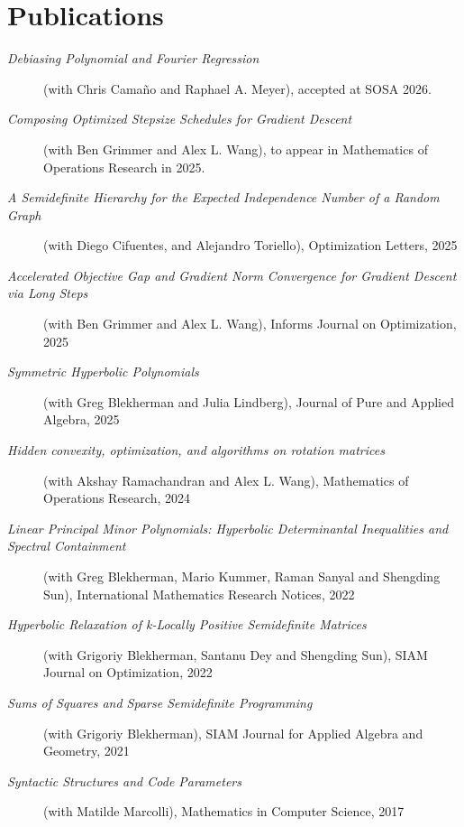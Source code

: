 \documentclass[10pt, letterpaper]{article}
\begin{document}
\section{Publications}
\begin{description}
    \item[\emph{Debiasing Polynomial and Fourier Regression}] (with Chris Camaño and Raphael A. Meyer), accepted at SOSA 2026.\\

    \item[\emph{Composing Optimized Stepsize Schedules for Gradient Descent}] (with Ben Grimmer and Alex L. Wang), to appear in Mathematics of Operations Research in 2025.\\

    \item[\emph{A Semidefinite Hierarchy for the Expected Independence Number of a Random Graph}] (with Diego Cifuentes, and Alejandro Toriello), Optimization Letters, 2025\\

    \item[\emph{Accelerated Objective Gap and Gradient Norm Convergence for Gradient Descent via Long Steps}] (with Ben Grimmer and Alex L. Wang), Informs Journal on Optimization, 2025\\

    \item[\emph{Symmetric Hyperbolic Polynomials}] (with Greg Blekherman and Julia Lindberg), Journal of Pure and Applied Algebra, 2025\\

    \item[\emph{Hidden convexity, optimization, and algorithms on rotation matrices  }] (with Akshay Ramachandran and Alex L. Wang), Mathematics of Operations Research, 2024\\

    \item[\emph{Linear Principal Minor Polynomials: Hyperbolic Determinantal Inequalities and Spectral Containment }] (with Greg Blekherman, Mario Kummer, Raman Sanyal and Shengding Sun), International Mathematics Research Notices, 2022\\

    \item[\emph{Hyperbolic Relaxation of k-Locally Positive Semidefinite Matrices}] (with Grigoriy Blekherman, Santanu Dey and Shengding Sun), SIAM Journal on Optimization, 2022\\

    \item[\emph{Sums of Squares and Sparse Semidefinite Programming}] (with Grigoriy Blekherman),
SIAM Journal for Applied Algebra and Geometry, 2021\\

    \item[\emph{Syntactic Structures and Code Parameters}] (with Matilde Marcolli), Mathematics in Computer Science, 2017
\end{description}
\end{document}
